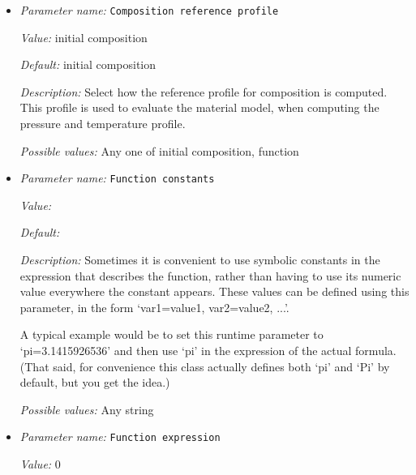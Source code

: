 \begin{itemize}
\item {\it Parameter name:} {\tt Composition reference profile}
\label{parameters:Adiabatic conditions model/Compute profile/Composition reference profile}
\label{parameters:Adiabatic_20conditions_20model/Compute_20profile/Composition_20reference_20profile}


{\it Value:} initial composition


{\it Default:} initial composition


{\it Description:} Select how the reference profile for composition is computed. This profile is used to evaluate the material model, when computing the pressure and temperature profile.


{\it Possible values:} Any one of initial composition, function
\item {\it Parameter name:} {\tt Function constants}
\label{parameters:Adiabatic conditions model/Compute profile/Function constants}
\label{parameters:Adiabatic_20conditions_20model/Compute_20profile/Function_20constants}


{\it Value:} 


{\it Default:} 


{\it Description:} Sometimes it is convenient to use symbolic constants in the expression that describes the function, rather than having to use its numeric value everywhere the constant appears. These values can be defined using this parameter, in the form `var1=value1, var2=value2, ...'.

A typical example would be to set this runtime parameter to `pi=3.1415926536' and then use `pi' in the expression of the actual formula. (That said, for convenience this class actually defines both `pi' and `Pi' by default, but you get the idea.)


{\it Possible values:} Any string
\item {\it Parameter name:} {\tt Function expression}
\label{parameters:Adiabatic conditions model/Compute profile/Function expression}
\label{parameters:Adiabatic_20conditions_20model/Compute_20profile/Function_20expression}


{\it Value:} 0



\end{itemize}
